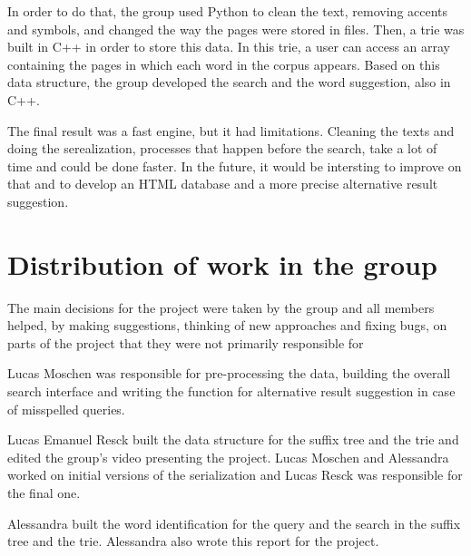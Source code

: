 \documentclass{article}
\begin{document}
In order to do that, the group used Python to clean the text, removing accents and symbols, and changed the way the pages were stored in files. Then, a trie was built in C++ in order to store this data. In this trie, a user can access an array containing the pages in which each word in the corpus appears. Based on this data structure, the group developed the search and the word suggestion, also in C++. 

The final result was a fast engine, but it had limitations. Cleaning the texts and doing the serealization, processes that happen before the search, take a lot of time and could be done faster. In the future, it would be intersting to improve on that and to develop an HTML database and a more precise alternative result suggestion. 

\section*{Distribution of work in the group}
The main decisions for the project were taken by the group and all members helped, by making suggestions, thinking of new approaches and fixing bugs, on parts of the project that they were not primarily responsible for

Lucas Moschen was responsible for pre-processing the data, building the overall search interface and writing the function for alternative result suggestion in case of misspelled queries. 

Lucas Emanuel Resck built the data structure for the suffix tree and the trie and edited the group's video presenting the project. Lucas Moschen and Alessandra worked on initial versions of the serialization and Lucas Resck was responsible for the final one. 

Alessandra built the word identification for the query and the search in the suffix tree and the trie. Alessandra also wrote this report for the project. 

\end{document}

